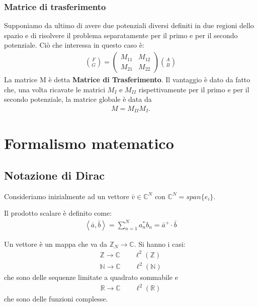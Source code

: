 \subsection{Matrice di trasferimento} %
Supponiamo da ultimo di avere due potenziali diversi definiti in due regioni dello spazio e di risolvere il problema separatamente per il primo e per il secondo potenziale.
Ciò che interessa in questo caso è:
\begin{equation}\begin{split}
{F\choose G} =\left(\begin{matrix} {M_{11}} & {M_{12}}\\{M_{21}} & {M_{22}}\end{matrix}\right){{A}\choose{B}}
\end{split}\end{equation}
La matrice M è detta \textbf{Matrice di Trasferimento}.
Il vantaggio è dato da fatto che, una volta ricavate le matrici $M_I$ e $M_{II}$ rispettivamente per il primo e per il secondo potenziale, la matrice globale è data da
\begin{equation}\begin{split}
M=M_{II}M_{I}.
\end{split}\end{equation}

\chapter{Formalismo matematico} %
\section{Notazione di Dirac} %
Consideriamo inizialmente ad un vettore $\bar v\in \mathbb{C} ^N$ con $\mathbb{C} ^N=span\{e_i\}$.

Il prodotto scalare è definito come:
\begin{equation}\begin{split}
\left\langle \bar a,\bar b \right\rangle=\sum_{n=1}^{N}{a^*_nb_n}=\bar a^+\cdot \bar b
\end{split}\end{equation}

Un vettore è un mappa che va da $\mathbb{Z}_N \rightarrow \mathbb{C} $. 
Si hanno i casi:
\begin{equation}\begin{split}
\mathbb{Z} \rightarrow \mathbb{C} \qquad \ell^2\left(\mathbb{Z}\right) \\
\mathbb{N} \rightarrow \mathbb{C} \qquad \ell^2\left(\mathbb{N}\right)
\end{split}\end{equation}
che sono delle sequenze limitate a quadrato sommabile e
\begin{equation}\begin{split}
\mathbb{R} \rightarrow \mathbb{C} \qquad \ell^2\left(\mathbb{R}\right)
\end{split}\end{equation}
che sono delle funzioni complesse.

